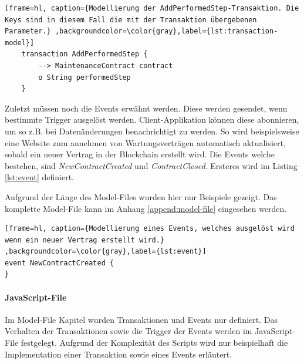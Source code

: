\begin{lstfloat}
    \begin{lstlisting}[frame=hl, caption={Modellierung der AddPerformedStep-Transaktion. Die Keys sind in diesem Fall die mit der Transaktion übergebenen Parameter.} ,backgroundcolor=\color{gray},label={lst:transaction-model}]
    transaction AddPerformedStep {
        --> MaintenanceContract contract
        o String performedStep
    }
    \end{lstlisting} 
\end{lstfloat}

Zuletzt müssen noch die Events erwähnt werden. Diese werden gesendet, wenn bestimmte Trigger ausgelöst werden. Client-Applikation können diese abonnieren, um so z.B. bei Datenänderungen benachrichtigt zu werden. So wird beispielsweise eine Website zum annehmen von Wartungsverträgen automatisch aktualisiert, sobald ein neuer Vertrag in der Blockchain erstellt wird. Die Events welche bestehen, sind \textit{NewContractCreated} und \textit{ContractClosed}. Ersteres wird im Listing \ref{lst:event} definiert. 

Aufgrund der Länge des Model-Files wurden hier nur Beispiele gezeigt. Das komplette Model-File kann im Anhang \ref{append:model-file} eingesehen werden.

\begin{lstfloat}
\begin{lstlisting}[frame=hl, caption={Modellierung eines Events, welches ausgelöst wird wenn ein neuer Vertrag erstellt wird.} ,backgroundcolor=\color{gray},label={lst:event}]
event NewContractCreated {
}
\end{lstlisting} 
\end{lstfloat}

\paragraph{JavaScript-File}
Im Model-File Kapitel wurden Transaktionen und Events nur definiert. Das Verhalten der Transaktionen sowie die Trigger der Events werden im JavaScript-File festgelegt. Aufgrund der Komplexität des Scripts wird nur beispielhaft die Implementation einer Transaktion sowie eines Events erläutert.

